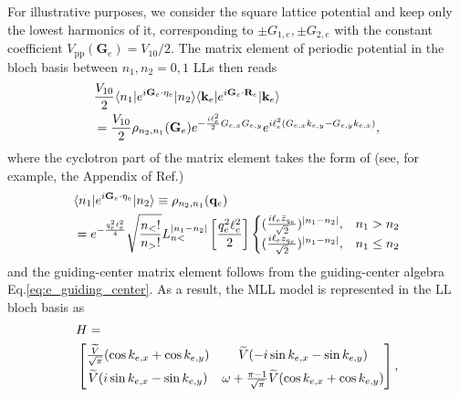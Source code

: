 For illustrative purposes, we consider the square lattice potential and keep only the lowest harmonics of it, corresponding to $\pm G_{1,e},\pm G_{2,e}$ with the constant coefficient $V_{\text{pp}}(\mathbf{G}_e)=V_{10}/2$. The matrix element of periodic potential in the bloch basis between $n_1,n_2=0,1$ LLs then reads
\begin{align}
     & \frac{V_{10}}{2}\langle n_1|e^{i\mathbf{G}_e\cdot\eta_e}|n_2\rangle \langle\mathbf{k}_e|e^{i\mathbf{G}_e\cdot\mathbf{R}_e}|\mathbf{k}_e\rangle\notag \\
     & =\frac{V_{10}}{2}\rho_{n_2,n_1}(\mathbf{G}_e) e^{-\frac{i\ell_e^2}{2}G_{e,x} G_{e,y}} e^{i\ell_e^2 (G_{e,x}k_{e,y}-G_{e,y}k_{e,x})},
\end{align}
where the cyclotron part of the matrix element takes the form of (see, for example, the Appendix of Ref.\cite{murthy2003hamiltonian})
\begin{align*}
     & \langle n_1|e^{i\mathbf{G}_e\cdot\eta_e}|n_2\rangle\equiv\rho_{n_2,n_1}(\mathbf{q}_e)\notag                                                                                                                           \\
     & =e^{-\frac{q_e^2\ell_e^2}{4}}\sqrt{\frac{n_<!}{n_>!}} L_{n<}^{|n_1-n_2|}\left[\frac{q_e^2\ell_e^2}{2}\right]\begin{cases}
                                                                                                                       (\tfrac{i\ell_e\bar z_{q_e}}{\sqrt{2}})^{|n_1-n_2|}, & n_1>n_2     \\
                                                                                                                       (\tfrac{i\ell_e z_{q_e}}{\sqrt{2}})^{|n_1-n_2|},     & n_1\leq n_2 \\
                                                                                                                   \end{cases}
\end{align*}
and the guiding-center matrix element follows from the guiding-center algebra Eq.\eqref{eq:e_guiding_center}. As a result, the MLL model is represented in the LL bloch basis \cite{murthy2012hamiltonian} as
\begin{align}\label{eq:MLL effecitve Hamiltonian}
     & H=\notag                                                                                                                                               \\
     & \begin{bmatrix}
           \frac{\widetilde{V}}{\sqrt\pi}(\cos k_{e,x}+\cos k_{e,y}) & \widetilde{V}(-i\sin k_{e,x}-\sin k_{e,y})                              \\[0.5em]
           \widetilde{V}(i\sin k_{e,x}-\sin k_{e,y})                 & \omega+\frac{\pi-1}{\sqrt{\pi}}\widetilde{V}(\cos k_{e,x}+\cos k_{e,y})
       \end{bmatrix},
\end{align}
